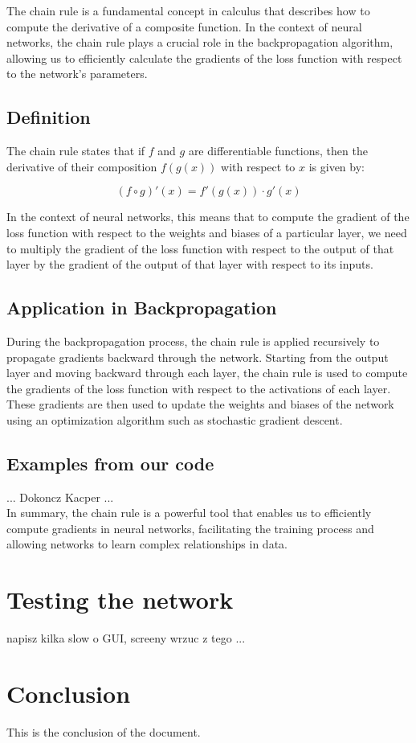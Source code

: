 \documentclass{article}
\begin{document}
The chain rule is a fundamental concept in calculus that describes how to compute the derivative of a composite function. In the context of neural networks, the chain rule plays a crucial role in the backpropagation algorithm, allowing us to efficiently calculate the gradients of the loss function with respect to the network's parameters.

\subsection{Definition}

The chain rule states that if \( f \) and \( g \) are differentiable functions, then the derivative of their composition \( f(g(x)) \) with respect to \( x \) is given by:

\[
(f \circ g)'(x) = f'(g(x)) \cdot g'(x)
\]

In the context of neural networks, this means that to compute the gradient of the loss function with respect to the weights and biases of a particular layer, we need to multiply the gradient of the loss function with respect to the output of that layer by the gradient of the output of that layer with respect to its inputs.

\subsection{Application in Backpropagation}

During the backpropagation process, the chain rule is applied recursively to propagate gradients backward through the network. Starting from the output layer and moving backward through each layer, the chain rule is used to compute the gradients of the loss function with respect to the activations of each layer. These gradients are then used to update the weights and biases of the network using an optimization algorithm such as stochastic gradient descent.

\subsection{Examples from our code}
... Dokoncz Kacper ...\\
In summary, the chain rule is a powerful tool that enables us to efficiently compute gradients in neural networks, facilitating the training process and allowing networks to learn complex relationships in data.

\newpage
\section{Testing the network}
napisz kilka slow o GUI, screeny wrzuc z tego
...

\newpage
\section{Conclusion}
This is the conclusion of the document.

\newpage
\printbibliography 
\end{document}
